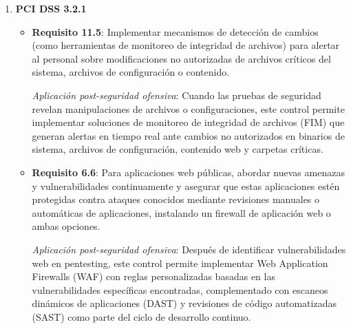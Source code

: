 {\begin{enumerate}
\begin{itemize}
        \item \textbf{V5.3.5 - Validación de entradas}: Especifica que la aplicación debe sanitizar, deshabilitar o sandbox contenido HTML, CSS y JavaScript proporcionado por el usuario.
        
        \textit{Aplicación post-seguridad ofensiva}: Tras descubrir vulnerabilidades de inyección durante pruebas de penetración, este control permite implementar bibliotecas de validación/sanitización, configurar cabeceras de seguridad como Content-Security-Policy, y utilizar técnicas avanzadas como listas blancas para filtrar entradas de usuario y prevenir ataques como XSS, CSRF y clickjacking.
    \end{itemize}

    \item \textbf{PCI DSS 3.2.1}
    \begin{itemize}
        \item \textbf{Requisito 11.5}: Implementar mecanismos de detección de cambios (como herramientas de monitoreo de integridad de archivos) para alertar al personal sobre modificaciones no autorizadas de archivos críticos del sistema, archivos de configuración o contenido.
        
        \textit{Aplicación post-seguridad ofensiva}: Cuando las pruebas de seguridad revelan manipulaciones de archivos o configuraciones, este control permite implementar soluciones de monitoreo de integridad de archivos (FIM) que generan alertas en tiempo real ante cambios no autorizados en binarios de sistema, archivos de configuración, contenido web y carpetas críticas.
        
        \item \textbf{Requisito 6.6}: Para aplicaciones web públicas, abordar nuevas amenazas y vulnerabilidades continuamente y asegurar que estas aplicaciones estén protegidas contra ataques conocidos mediante revisiones manuales o automáticas de aplicaciones, instalando un firewall de aplicación web o ambas opciones.
        
        \textit{Aplicación post-seguridad ofensiva}: Después de identificar vulnerabilidades web en pentesting, este control permite implementar Web Application Firewalls (WAF) con reglas personalizadas basadas en las vulnerabilidades específicas encontradas, complementado con escaneos dinámicos de aplicaciones (DAST) y revisiones de código automatizadas (SAST) como parte del ciclo de desarrollo continuo.
    \end{itemize}
\end{enumerate}

}
